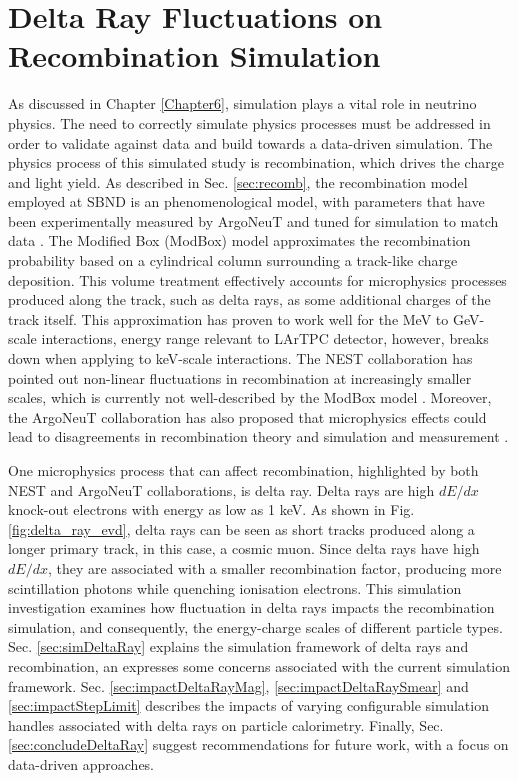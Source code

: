 \section{Delta Ray Fluctuations on Recombination Simulation}

As discussed in Chapter \ref{Chapter6}, simulation plays a vital role in neutrino physics.
The need to correctly simulate physics processes must be addressed in order to validate against data and build towards a data-driven simulation.
The physics process of this simulated study is recombination, which drives the charge and light yield.
As described in Sec. \ref{sec:recomb}, the recombination model employed at SBND is an phenomenological model, with parameters that have been experimentally measured by ArgoNeuT and tuned for simulation to match data \cite{argoneut_recomb}.
The Modified Box (ModBox) model approximates the recombination probability based on a cylindrical column surrounding a track-like charge deposition.
This volume treatment effectively accounts for microphysics processes produced along the track, such as delta rays, as some additional charges of the track itself.
This approximation has proven to work well for the MeV to GeV-scale interactions, energy range relevant to LArTPC detector, however, breaks down when applying to keV-scale interactions.
The NEST collaboration has pointed out non-linear fluctuations in recombination at increasingly smaller scales, which is currently not well-described by the ModBox model \cite{NEST}. 
Moreover, the ArgoNeuT collaboration has also proposed that microphysics effects could lead to disagreements in recombination theory and simulation and measurement \cite{argoneut_recomb}.

One microphysics process that can affect recombination, highlighted by both NEST and ArgoNeuT collaborations, is delta ray.
Delta rays are high $dE/dx$ knock-out electrons with energy as low as 1 keV.
As shown in Fig. \ref{fig:delta_ray_evd}, delta rays can be seen as short tracks produced along a longer primary track, in this case, a cosmic muon.
Since delta rays have high $dE/dx$, they are associated with a smaller recombination factor, producing more scintillation photons  while quenching ionisation electrons.
This simulation investigation examines how fluctuation in delta rays impacts the recombination simulation, and consequently, the energy-charge scales of different particle types.
Sec. \ref{sec:simDeltaRay} explains the simulation framework of delta rays and recombination, an expresses some concerns associated with the current simulation framework.
Sec. \ref{sec:impactDeltaRayMag}, \ref{sec:impactDeltaRaySmear} and \ref{sec:impactStepLimit} describes the impacts of varying configurable simulation handles associated with delta rays on particle calorimetry.
Finally, Sec. \ref{sec:concludeDeltaRay} suggest recommendations for future work, with a focus on data-driven approaches.

